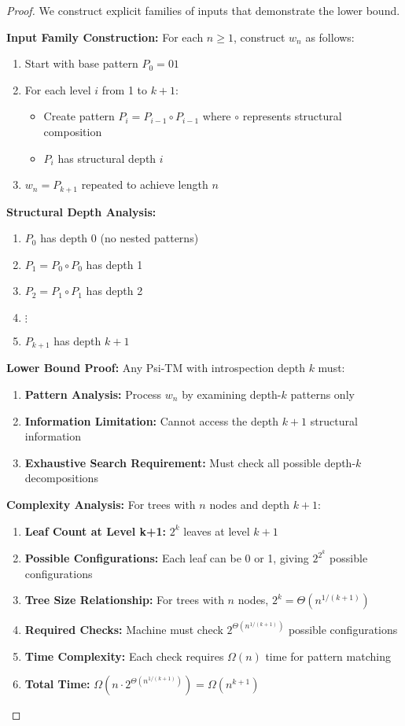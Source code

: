 \begin{proof}
We construct explicit families of inputs that demonstrate the lower bound.

\textbf{Input Family Construction:}
For each $n \geq 1$, construct $w_n$ as follows:
\begin{enumerate}
\item Start with base pattern $P_0 = 01$
\item For each level $i$ from 1 to $k+1$:
   \begin{itemize}
   \item Create pattern $P_i = P_{i-1} \circ P_{i-1}$ where $\circ$ represents structural composition
   \item $P_i$ has structural depth $i$
   \end{itemize}
\item $w_n = P_{k+1}$ repeated to achieve length $n$
\end{enumerate}

\textbf{Structural Depth Analysis:}
\begin{enumerate}
\item $P_0$ has depth 0 (no nested patterns)
\item $P_1 = P_0 \circ P_0$ has depth 1
\item $P_2 = P_1 \circ P_1$ has depth 2
\item $\vdots$
\item $P_{k+1}$ has depth $k+1$
\end{enumerate}

\textbf{Lower Bound Proof:}
Any Psi-TM with introspection depth $k$ must:

\begin{enumerate}
\item \textbf{Pattern Analysis:} Process $w_n$ by examining depth-$k$ patterns only
\item \textbf{Information Limitation:} Cannot access the depth $k+1$ structural information
\item \textbf{Exhaustive Search Requirement:} Must check all possible depth-$k$ decompositions
\end{enumerate}

\textbf{Complexity Analysis:}
For trees with $n$ nodes and depth $k+1$:

\begin{enumerate}
\item \textbf{Leaf Count at Level k+1:} $2^k$ leaves at level $k+1$
\item \textbf{Possible Configurations:} Each leaf can be 0 or 1, giving $2^{2^k}$ possible configurations
\item \textbf{Tree Size Relationship:} For trees with $n$ nodes, $2^k = \Theta(n^{1/(k+1)})$
\item \textbf{Required Checks:} Machine must check $2^{\Theta(n^{1/(k+1)})}$ possible configurations
\item \textbf{Time Complexity:} Each check requires $\Omega(n)$ time for pattern matching
\item \textbf{Total Time:} $\Omega(n \cdot 2^{\Theta(n^{1/(k+1)})}) = \Omega(n^{k+1})$
\end{enumerate}


\end{proof}
